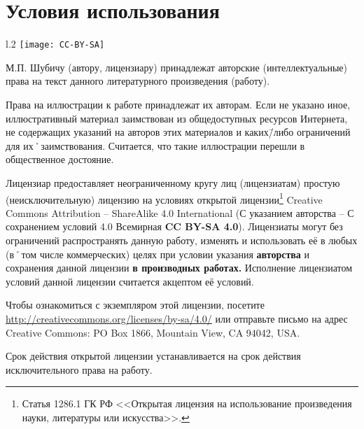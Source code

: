 ﻿%
\chapter{Условия использования}

\begin{wrapfigure}{l}{.2\textwidth}
\centering
\texttt{[image: CC-BY-SA]}
\label{fig:CC-BY-SA}
\end{wrapfigure}

\noindent М.П. Шубичу (автору, лицензиару) принадлежат авторские (интеллектуальные) права на текст данного литературного произведения (работу). 

\noindent Права на иллюстрации к работе принадлежат их авторам. Если не указано иное, иллюстративный материал заимствован из общедоступных ресурсов Интернета, не содержащих указаний на авторов этих материалов и каких\=/либо ограничений для их˚заимствования. Считается, что такие иллюстрации перешли в общественное достояние.

Лицензиар предоставляет неограниченному кругу лиц (лицензиатам) простую (неисключительную) лицензию на условиях открытой лицензии\footnote
{Статья 1286.1 ГК РФ <<Открытая лицензия на использование произведения науки, литературы или искусства>>.}
Creative Commons Attribution \--- ShareAlike 4.0 International (С указанием авторства \--- С сохранением условий 4.0 Всемирная \textbf{CC BY-SA 4.0}). Лицензиаты могут без ограничений распространять данную работу, изменять и использовать её в любых (в˚том числе коммерческих) целях при условии указания \textbf{авторства} и сохранения данной лицензии \textbf{в производных работах.}
Исполнение лицензиатом условий данной лицензии считается акцептом её условий.

Чтобы ознакомиться с экземпляром этой лицензии, посетите \url{http://creativecommons.org/licenses/by-sa/4.0/} или отправьте письмо на адрес Creative Commons: PO Box 1866, Mountain View, CA 94042, USA.{\sloppy

}%

Срок действия открытой лицензии устанавливается на срок действия исключительного права на работу.